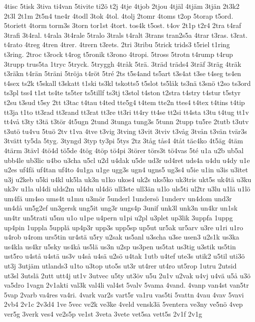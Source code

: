 {4tisc
5tisk
3tiva
ti4van
5tivite
ti2ö
t2j
4tje
4tjob
2tjou
4tjäl
4tjäm
3tjän
2t3k2
2t3l
2t1m
2t5n4
tne4r
4todl
3tok
4tol.
4tolj
2tomr
4toms
t2op
5torap
t5ord.
5toriett
4torm
torm3s
3torn
tor1st
4tort.
tos4k
t5ost.
t4ov
2t1p
t2r4
2tra
t4raf
3trafi
3t4ral.
t4rala
3t4rale
5tralo
3trals
t4ralt
3trans
tran2s5a
4trar
t3ras.
t3rat.
t4rato
4treg
4tren
4trer.
4trern
t3rets.
2tri
3tribu
5trick
trids3
t5riel
t1ring
t3ring.
2troc
t3rock
t4rog
t5ronik
t3rono
4tropi.
5tross
5trotn
t4rump
t4rup
3trupp
trus5ta
1tryc
5tryck.
5tryggh
4tråk
5trä.
3träd
träds4
3träf
3träg
4träk
t3räkn
t4rän
5träni
5tröja
t4röt
5tré
2ts
t5s4and
ts5art
t3s4at
t3se
t4seg
ts4en
t4sex
ts2k
t5skall
t3skatt
t1ski
ts3kl
tskotts5
t5slot
ts5läk
ts3nä
t3snö
t2so
ts3ord
ts3pl
tss4
t1st
ts4te
ts5ter
ts5tillf
ts3tj
t3stol
t4ston
t2stra
t4stry
t4stur
t5styr
t2su
t3sud
t5sy
2tt
t3tac
t4tau
t4ted
tte5g4
t4tem
tte2n
ttes4
t4tex
t4tins
t4tip
tt3ja
t1to
tt3rad
tt3rand
tt3rat
tt3re
tt3ri
tt4ry
tt4se
tt2si
tt4sta
t3tu
t4tug
tt1v
tt4vå
t3ty
t3tä
t3tör
4t5ugn
2tund
3tunga
tung3s
5tunn
2tupp
tu5re
2tutb
t3utv
t3utö
tu4vu
5tuö
2tv
t1va
4tve
t3vig
3tving
t3vit
3tviv
t3våg
3tvån
t3vän
tvär3s
3tvätt
ty5da
5tyg.
3tyngd
3typ
ty3pi
5tys
2tz
3tåg
tås4
4tåt
täc4ko
4t5äg
4täm
4tärm
3tävl
4tö4d
tö5de
4tög
4töp
tö4pi
3törer
törs3t
tö4vas
5té
u1a
u2b
ub5al
ubb4le
ub3lic
u4bo
u3cha
u5cl
u2d
u4dak
u5de
ud3r
ud4ret
uds4a
u4du
u4dy
u1e
u2es
uf4fä
uf4tan
uf4to
4u1ga
u1ge
ugg3s
ugn4
ugns5
ug3s4
u5ie
u1in
u3is
u3itet
u3j
u2keb
u5ki
u4kl
uk5la
uk3n
u1ko
ukos4
uk2s
uks5ko
uk3tris
ukt5s
uk4tä
u3ku
uk3v
u1la
ul4di
ulds2m
ul4du
ul4dö
ull3ste
ull3än
u1lo
uls5ti
ul2tr
u3lu
u1lä
u1lö
um4fä
um4so
ums4t
u1mu
u3mör
5underl
1undersö
1underv
un4dom
und3r
un4då
un5g2ef
un3gersk
ung5it
ung3r
ungs4p
3unif
unk3l
unk3n
un4kr
un1sk
un4tr
un5trati
u5nu
u1o
u1pe
u4pern
u1pi
u2pl
u3plet
up3lik
3uppfa
1uppg
up4pin
1uppla
5upplä
up4p3r
upp3s
upp5sp
up5ut
ur5ak
ur5arv
u3re
u1ri
u1ro
u4rob
u4rom
urs5tin
ur4stä
u5ry
u2sak
us5anl
u3scha
u3se
usen3
u2s1k
us3ka
us4kla
us4kr
u5sky
us4kå
us5lä
us3n
u2sp
us3pen
us5tat
us3tig
u3stik
us5tin
ust5ro
u4stå
u4stä
us3v
u4så
u4sä
u2sö
u4tak
1utb
u4tef
ute3s
utik2
u5til
uti3ö
ut3j
3utjäm
utlands3
u1to
u3top
uto5s
ut3r
ut4rer
ut4ro
ut5rop
1utru
2utsid
ut3sl
3utslä
2utt
utt4j
ut1v
3utvec
u5ty
ut3öv
u5u
2u1v
u2vak
u4vj
u4vä
u5å
u3ö
va5dro
1vagn
2v1akti
val3k
val4li
val4st
5valv
5vama
4vand.
4vanp
van4st
van5tr
5vap
2varb
va4res
va4ri.
4vark
var2s
vart5r
va1ru
vas5ti
5vattn
4vau
4vav
5vavi
2vb4
2v1c
2v3d4
1ve
5vec
ve2k
ve3ke
4veld
vensk3ä
5ventera
ve3ny
ve5nö
4vep
ver5g
3verk
ves4
ve2s5p
ve1st
3veta
3vete
vet5sa
vett5s
2v1f
2v1g
}
